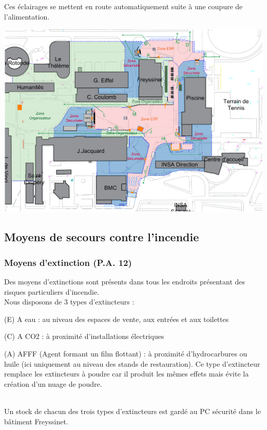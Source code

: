 \documentclass[hidelinks, paper=a4, fontsize=13pt]{report}
\begin{document}
Ces éclairages se mettent en route automatiquement suite à une coupure de l’alimentation. 


\begin{center}
	\includegraphics[width=.8\textwidth,keepaspectratio]{Exports/Plan_24h_44eme-Blocs_Phares}
\end{center}


\subsection{Moyens de secours contre l’incendie}
\label{moyensSecoursIncendie}
\subsubsection{Moyens d’extinction (P.A. 12)}

Des moyens d’extinctions sont présents dans tous les endroits présentant des risques particuliers d’incendie.\\
Nous disposons de 3 types d’extincteurs :
\begin{list}{•}{}
	\item (E) A eau : au niveau des espaces de vente, aux entrées et aux toilettes
	\item (C) A CO2 : à proximité d’installations électriques 
	\item (A) AFFF (Agent formant un film flottant) : à proximité d’hydrocarbures ou huile (ici uniquement au niveau des stands de restauration). Ce type d’extincteur remplace les extincteurs à poudre car il produit les mêmes effets mais évite la création d’un nuage de poudre.
\end{list} \mbox{}\\

Un stock de chacun des trois types d’extincteurs est gardé au PC sécurité dans le bâtiment Freyssinet. 
\end{document}
